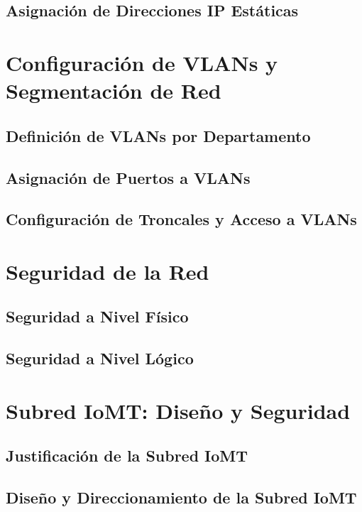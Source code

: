 \subsection{Asignación de Direcciones IP Estáticas}

\section{Configuración de VLANs y Segmentación de Red}

\subsection{Definición de VLANs por Departamento}

\subsection{Asignación de Puertos a VLANs}

\subsection{Configuración de Troncales y Acceso a VLANs}

\section{Seguridad de la Red}

\subsection{Seguridad a Nivel Físico}

\subsection{Seguridad a Nivel Lógico}

\section{Subred IoMT: Diseño y Seguridad}

\subsection{Justificación de la Subred IoMT}

\subsection{Diseño y Direccionamiento de la Subred IoMT}

